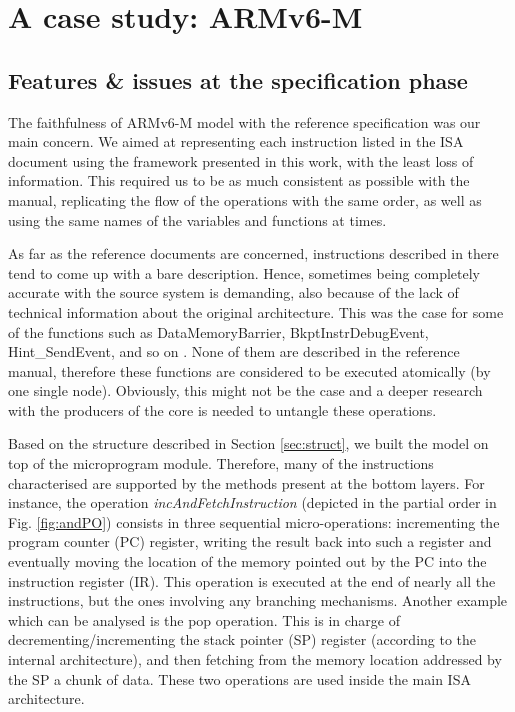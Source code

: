 \documentclass[conference]{IEEEtran}
\begin{document}
\section{A case study: ARMv6-M}
\label{sec:arm}

\subsection{Features \& issues at the specification phase}
\label{sec:feat}
The faithfulness of ARMv6-M model with the reference specification was our main concern.
We aimed at representing each instruction listed in the ISA document using the
framework presented in this work, with the least loss of information. This required us to be
as much consistent as possible with the manual, replicating the flow of the operations with
the same order, as well as using the same names of the variables and functions at times.

As far as the reference documents are concerned, instructions described in there tend to come
up with a bare description. Hence, sometimes being completely accurate with 
the source system is demanding, also because of the lack of technical information about the
original architecture. This was the case for some of the functions such as DataMemoryBarrier,
BkptInstrDebugEvent, Hint\_SendEvent, and so on \cite{armManual}.
None of them are described in the reference manual, therefore these
functions are considered to be executed atomically (by one single node). Obviously, this
might not be the case and a deeper research with the producers of the core is needed to
untangle these operations.

Based on the structure described in Section \ref{sec:struct}, we built the model on top of
the microprogram module. Therefore, many of the instructions characterised are supported by
the methods present at the bottom layers. For instance, the operation
\textit{incAndFetchInstruction} (depicted in the partial order in Fig. \ref{fig:andPO})
consists in three sequential micro-operations: incrementing the program counter (PC)
register, writing the result back into such a register and eventually moving the location of
the memory pointed out by the PC into the instruction register (IR). This operation is
executed at the end of nearly all the instructions, but the ones involving any branching
mechanisms. Another example which can be analysed is the pop operation. This is in charge of
decrementing/incrementing the stack pointer (SP) register (according to the internal
architecture), and then fetching from the memory location addressed by the SP a chunk of 
data. These two operations are used inside the main ISA architecture.
\end{document}
